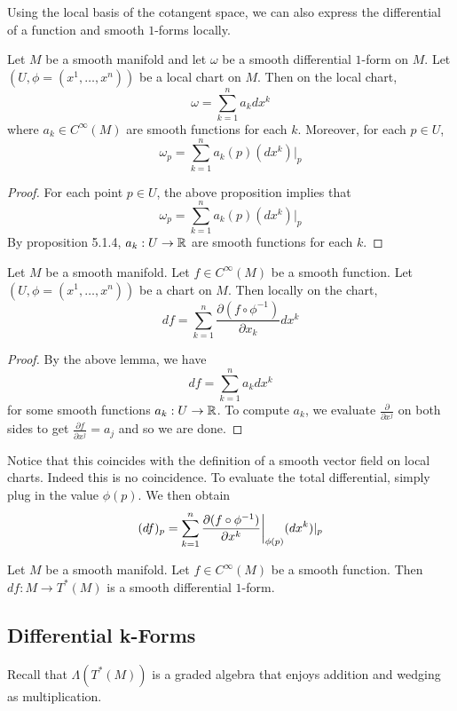 \documentclass[a4paper]{article}
\begin{document}
Using the local basis of the cotangent space, we can also express the differential of a function and smooth $1$-forms locally. 

\begin{lmm}{}{} Let $M$ be a smooth manifold and let $\omega$ be a smooth differential $1$-form on $M$. Let $(U,\phi=(x^1,\dots,x^n))$ be a local chart on $M$. Then on the local chart, $$\omega=\sum_{k=1}^na_kdx^k$$ where $a_k\in C^\infty(M)$ are smooth functions for each $k$. Moreover, for each $p\in U$, $$\omega_p=\sum_{k=1}^na_k(p)(dx^k)|_p$$ \tcbline
\begin{proof}
For each point $p\in U$, the above proposition implies that $$\omega_p=\sum_{k=1}^na_k(p)(dx^k)|_p$$ By proposition 5.1.4, $a_k:U\to\mathbb{R}$ are smooth functions for each $k$. 
\end{proof}
\end{lmm}

\begin{prp}{}{} Let $M$ be a smooth manifold. Let $f\in C^\infty(M)$ be a smooth function. Let $(U,\phi=(x^1,\dots,x^n))$ be a chart on $M$. Then locally on the chart, $$df=\sum_{k=1}^n\frac{\partial(f\circ\phi^{-1})}{\partial x_k}dx^k$$ \tcbline
\begin{proof}
By the above lemma, we have $$df=\sum_{k=1}^na_kdx^k$$ for some smooth functions $a_k:U\to\mathbb{R}$. To compute $a_k$, we evaluate $\frac{\partial}{\partial x^j}$ on both sides to get $\frac{\partial f}{\partial x^j}=a_j$ and so we are done. 
\end{proof}
\end{prp}

Notice that this coincides with the definition of a smooth vector field on local charts. Indeed this is no coincidence. To evaluate the total differential, simply plug in the value $\phi(p)$. We then obtain $$(df)_p=\sum_{k=1}^n\frac{\partial(f\circ\phi^{-1})}{\partial x^k}\bigg{|}_{\phi(p)}(dx^k)|_p$$

\begin{lmm}{}{} Let $M$ be a smooth manifold. Let $f\in C^\infty(M)$ be a smooth function. Then $df:M\to T^\ast(M)$ is a smooth differential $1$-form. 
\end{lmm}

\subsection{Differential k-Forms}
Recall that $\Lambda(T^\ast(M))$ is a graded algebra that enjoys addition and wedging as multiplication. 
\end{document}
